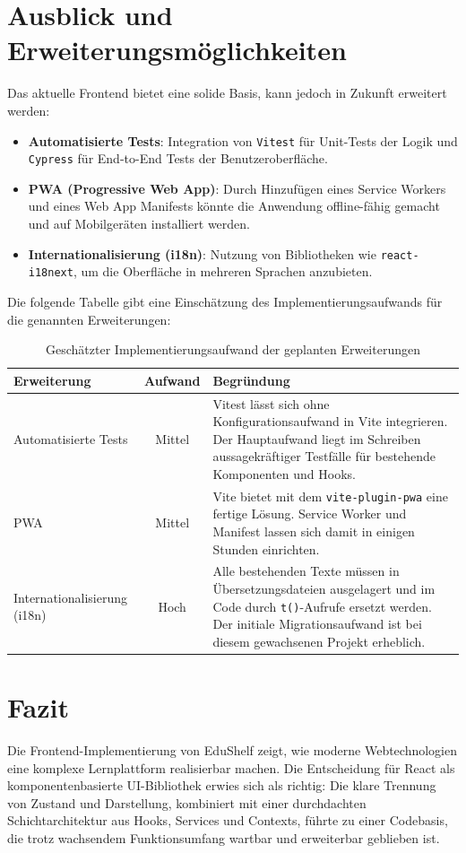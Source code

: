\section{Ausblick und Erweiterungsmöglichkeiten}
Das aktuelle Frontend bietet eine solide Basis, kann jedoch in Zukunft erweitert werden:
\begin{itemize}
    \item \textbf{Automatisierte Tests}: Integration von \texttt{Vitest} für Unit-Tests der Logik und \texttt{Cypress} für End-to-End Tests der Benutzeroberfläche.
    \item \textbf{PWA (Progressive Web App)}: Durch Hinzufügen eines Service Workers und eines Web App Manifests könnte die Anwendung offline-fähig gemacht und auf Mobilgeräten installiert werden.
    \item \textbf{Internationalisierung (i18n)}: Nutzung von Bibliotheken wie \texttt{react-i18next}, um die Oberfläche in mehreren Sprachen anzubieten.
\end{itemize}

Die folgende Tabelle gibt eine Einschätzung des Implementierungsaufwands für die genannten Erweiterungen:

\begin{table}[h]
\centering
\begin{tabular}{|l|c|p{7cm}|}
\hline
\textbf{Erweiterung} & \textbf{Aufwand} & \textbf{Begründung} \\
\hline
Automatisierte Tests & Mittel & Vitest lässt sich ohne Konfigurationsaufwand in Vite integrieren. Der Hauptaufwand liegt im Schreiben aussagekräftiger Testfälle für bestehende Komponenten und Hooks. \\
\hline
PWA & Mittel & Vite bietet mit dem \texttt{vite-plugin-pwa} eine fertige Lösung. Service Worker und Manifest lassen sich damit in einigen Stunden einrichten. \\
\hline
Internationalisierung (i18n) & Hoch & Alle bestehenden Texte müssen in Übersetzungsdateien ausgelagert und im Code durch \texttt{t()}-Aufrufe ersetzt werden. Der initiale Migrationsaufwand ist bei diesem gewachsenen Projekt erheblich. \\
\hline
\end{tabular}
\vspace{4pt}
\caption{Geschätzter Implementierungsaufwand der geplanten Erweiterungen}
\label{tab:erweiterungsaufwand}
\end{table}
\newpage

\section{Fazit}
Die Frontend-Implementierung von EduShelf zeigt, wie moderne Webtechnologien eine komplexe Lernplattform realisierbar machen. Die Entscheidung für React als komponentenbasierte UI-Bibliothek erwies sich als richtig: Die klare Trennung von Zustand und Darstellung, kombiniert mit einer durchdachten Schichtarchitektur aus Hooks, Services und Contexts, führte zu einer Codebasis, die trotz wachsendem Funktionsumfang wartbar und erweiterbar geblieben ist.
\newline

